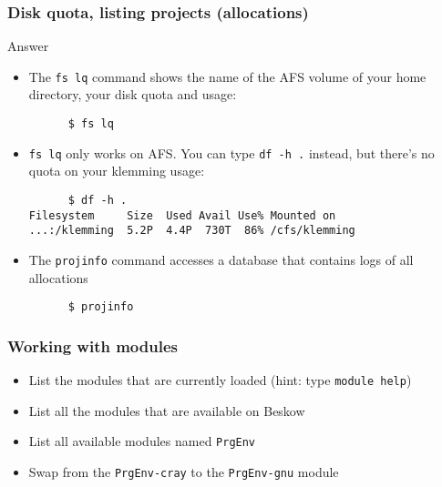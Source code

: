 \begin{frame}[fragile]
  \frametitle{Disk quota, listing projects (allocations)}
\begin{exampleblock}{{Answer}}
    \verbatimfont{\footnotesize}
    \begin{itemize}
    \item The \verb|fs lq| command shows the name of the AFS volume of your home directory, your disk quota and usage:
    \begin{verbatim}
      $ fs lq
    \end{verbatim}

    \item \verb|fs lq| only works on AFS. You can type \verb|df -h .| instead, but there's no quota on your klemming usage:
    \begin{verbatim}
      $ df -h .
Filesystem     Size  Used Avail Use% Mounted on
...:/klemming  5.2P  4.4P  730T  86% /cfs/klemming
    \end{verbatim}

    \item The \verb|projinfo| command accesses a database that contains logs of all allocations 
    \begin{verbatim}
      $ projinfo
    \end{verbatim}

    \end{itemize}

\end{exampleblock}
\end{frame}




\begin{frame}[fragile]
  \frametitle{Working with modules}
\begin{itemize}
  \item List the modules that are currently loaded (hint: type \verb|module help|)
  \item List all the modules that are available on Beskow
  \item List all available modules named \verb|PrgEnv|
  \item Swap from the \verb|PrgEnv-cray| to the \verb|PrgEnv-gnu| module
\end{itemize}
\end{frame}


